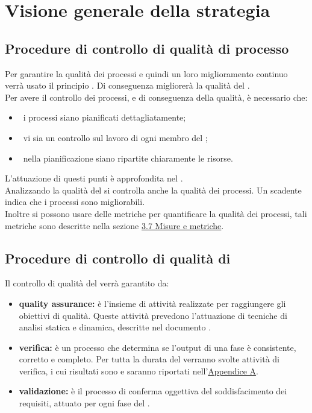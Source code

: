 
\section{Visione generale della strategia}
\label{sec:3}
	\subsection{Procedure di controllo di qualità di processo}
	\label{sec:3.1}
		Per garantire la qualità dei processi e quindi un loro miglioramento continuo verrà usato il principio . Di conseguenza migliorerà la qualità del . \\
		Per avere il controllo dei processi, e di conseguenza della qualità, è necessario che:
		\begin{itemize}
			\item\ i processi siano pianificati dettagliatamente;
			\item\ vi sia un controllo sul lavoro di ogni membro del ;
			\item\ nella pianificazione siano ripartite chiaramente le risorse.
		\end{itemize}
		L'attuazione di questi punti è approfondita nel \PPdoc. \\
		Analizzando la qualità del  si controlla anche la qualità dei processi. Un  scadente indica che i processi sono migliorabili. \\
		Inoltre si possono usare delle metriche per quantificare la qualità dei processi, tali metriche sono descritte nella sezione \hyperref[sec:3.7]{3.7 Misure e metriche}.
	\subsection{Procedure di controllo di qualità di }
	\label{sec:3.2}
		Il controllo di qualità del  verrà garantito da:
		\begin{itemize}
			\item \textbf{quality assurance:} è l'insieme di attività realizzate per raggiungere gli obiettivi di qualità. Queste attività prevedono l'attuazione di tecniche di analisi statica e dinamica, descritte nel documento \NPdoc.
			\item \textbf{verifica:} è un processo che determina se l'output di una fase è consistente, corretto e completo. Per tutta la durata del  verranno svolte attività di verifica, i cui risultati sono e saranno riportati nell'\hyperref[sec:A]{Appendice A}.
			\item \textbf{validazione:} è il processo di conferma oggettiva del soddisfacimento dei requisiti, attuato per ogni fase del .
		\end{itemize}
